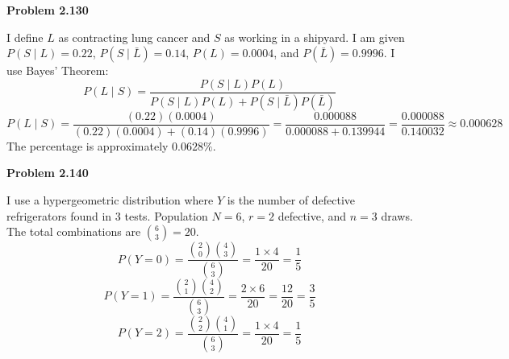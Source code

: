 \documentclass[11pt]{article}
\begin{document}
\textbf{\large Problem 2.130}

I define $L$ as contracting lung cancer and $S$ as working in a shipyard. I am given $P(S \mid L) = 0.22$, $P(S \mid \bar{L}) = 0.14$, $P(L) = 0.0004$, and $P(\bar{L}) = 0.9996$. I use Bayes' Theorem:
\[
P(L \mid S) = \frac{P(S \mid L)P(L)}{P(S \mid L)P(L) + P(S \mid \bar{L})P(\bar{L})}
\]
\[
P(L \mid S) = \frac{(0.22)(0.0004)}{(0.22)(0.0004) + (0.14)(0.9996)} = \frac{0.000088}{0.000088 + 0.139944} = \frac{0.000088}{0.140032} \approx 0.000628
\]
The percentage is approximately $0.0628\%$.

\textbf{\large Problem 2.140}

I use a hypergeometric distribution where $Y$ is the number of defective refrigerators found in 3 tests. Population $N=6$, $r=2$ defective, and $n=3$ draws. The total combinations are $\binom{6}{3} = 20$.
\[
P(Y = 0) = \frac{\binom{2}{0}\binom{4}{3}}{\binom{6}{3}} = \frac{1 \times 4}{20} = \frac{1}{5}
\]
\[
P(Y = 1) = \frac{\binom{2}{1}\binom{4}{2}}{\binom{6}{3}} = \frac{2 \times 6}{20} = \frac{12}{20} = \frac{3}{5}
\]
\[
P(Y = 2) = \frac{\binom{2}{2}\binom{4}{1}}{\binom{6}{3}} = \frac{1 \times 4}{20} = \frac{1}{5}
\]
\end{document}
